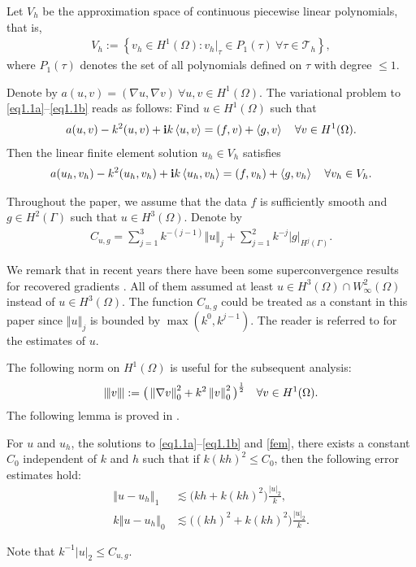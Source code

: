 \documentclass[leqno,final]{siamltex}
\numberwithin{equation}{section}
\newcommand{\norm}[1]{\left\Vert#1\right\Vert}
\newcommand{\norme}[1]{\left\Vert{\hskip -2.7pt}\left\vert #1 \right\vert{\hskip -2.7pt}\right\Vert}
\newcommand{\abs}[1]{\left\vert#1\right\vert}
\newcommand{\pd}[1]{\left\langle #1\right\rangle}
\newcommand{\set}[1]{\left\{#1\right\}}
\newcommand{\ls}{\lesssim}
\newcommand{\Ga}{\Gamma}
\newcommand{\na}{\nabla}
\newcommand{\Om}{\Omega}
\newcommand{\pa}{\partial}
\renewcommand{\i}{{\rm\mathbf i}}
\newcommand{\ue}{u_\mathcal{E}}
\newcommand{\ua}{u_\mathcal{A}}
\newcommand{\T}{\mathcal{T}}
\newcommand{\eq}[1]{\begin{align}#1\end{align}}
\newcommand{\eqn}[1]{\begin{align*}#1\end{align*}}
\begin{document}
Let $V_h$ be the approximation space of continuous piecewise linear polynomials,
 that is,
\eqn{ V_h:=\set{v_h\in H^1(\Om): v_h|_\tau\in P_1(\tau)\ \forall \tau\in\T_h}, }
where $P_1(\tau)$ denotes the set of all polynomials defined on $\tau$ with degree $\leq1$.

Denote by $a(u,v)=(\na u,\na v)\ \forall u,v\in H^1(\Om)$. The variational problem to \eqref{eq1.1a}--\eqref{eq1.1b} reads as follows:
Find $u\in H^1(\Om)$ such that
\eq{ a(u,v)-k^2(u,v)+\i k\pd{u,v}=(f,v)+\pd{g,v}\quad \forall v\in H^1(\Om). \label{pre-var} }
Then the linear finite element solution $u_h\in V_h$ satisfies
\eq{ a(u_h,v_h)-k^2(u_h,v_h)+\i k\pd{u_h,v_h}=(f,v_h)+\pd{g,v_h}\quad \forall v_h\in V_h. \label{fem} }

Throughout the paper, we assume that the data $f$ is sufficiently smooth and
$g\in H^2(\Ga)$ such that $u\in H^3(\Om)$.
Denote by
\eq{C_{u,g}=\sum_{j=1}^3 k^{-(j-1)}\norm{u}_j + \sum_{j=1}^2 k^{-j}\abs{g}_{H^j(\Ga)}.}

We remark that in recent years there have been some superconvergence results for recovered gradients \cite{wz07,xz03,yz01}.
All of them assumed at least $u\in H^3(\Om)\cap W^2_\infty(\Om)$ instead of $u\in H^3(\Om)$.
The function $C_{u,g}$ could be treated as a constant in this paper since $\norm{u}_j$
is bounded by $\max(k^0,k^{j-1})$. The reader is referred to \cite{mps13,ms10,ms11} for the estimates of $u$.

The following norm on $H^1(\Om)$ is useful for the subsequent analysis:
\eq{ \norme{v}:=\big(\norm{\na v}_0^2+k^2\norm{v}_0^2 \big)^{\frac{1}{2}}\quad \forall v\in H^1(\Om).\label{norme} }
%
%
The following lemma is proved in \cite{zw,dw}.
\begin{lemma} \label{lemma1}
For $u$ and $u_h$, the solutions to \eqref{eq1.1a}--\eqref{eq1.1b} and \eqref{fem}, there exists a
constant $C_0$ independent of $k$ and $h$ such that if $k(kh)^2\leq C_0$, then the following error estimates hold:
\eqn{ \norm{u-u_h}_1 &\ls \big(kh+k(kh)^2\big) \frac{\abs{u}_2}{k},\\
k\norm{u-u_h}_0 &\ls \big((kh)^2+k(kh)^2\big) \frac{\abs{u}_2}{k}. }
\end{lemma}
Note that $k^{-1}\abs{u}_2\le C_{u,g}$.
\end{document}
